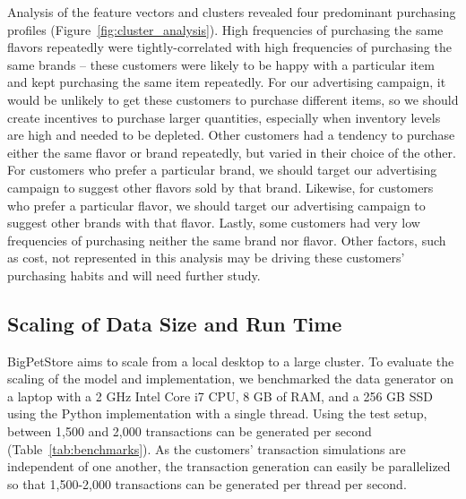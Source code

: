 \documentclass[conference]{IEEEtran}
\begin{document}
Analysis of the feature vectors and clusters revealed four predominant purchasing profiles (Figure~\ref{fig:cluster_analysis}).  High frequencies of purchasing the same flavors repeatedly were tightly-correlated with high frequencies of purchasing the same brands -- these customers were likely to be happy with a particular item and kept purchasing the same item repeatedly.  For our advertising campaign, it would be unlikely to get these customers to purchase different items, so we should create incentives to purchase larger quantities, especially when inventory levels are high and needed to be depleted.  Other customers had a tendency to purchase either the same flavor or brand repeatedly, but varied in their choice of the other.  For customers who prefer a particular brand, we should target our advertising campaign to suggest other flavors sold by that brand.  Likewise, for customers who prefer a particular flavor, we should target our advertising campaign to suggest other brands with that flavor.  Lastly, some customers had very low frequencies of purchasing neither the same brand nor flavor.  Other factors, such as cost, not represented in this analysis may be driving these customers' purchasing habits and will need further study.


\subsection{Scaling of Data Size and Run Time}
BigPetStore aims to scale from a local desktop to a large cluster. To evaluate the scaling of the model and implementation, we benchmarked the data generator on a laptop with a 2 GHz Intel Core i7 CPU, 8 GB of RAM, and a 256 GB SSD using the Python implementation with a single thread. Using the test setup, between 1,500 and 2,000 transactions can be generated per second (Table~\ref{tab:benchmarks}). As the customers' transaction simulations are independent of one another, the transaction generation can easily be parallelized so that 1,500-2,000 transactions can be generated per thread per second.
\end{document}
